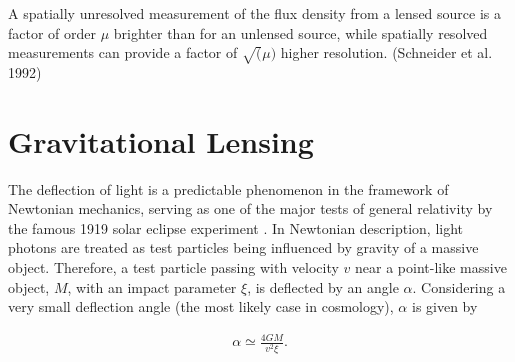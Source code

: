 \documentclass[paper=a4, fontsize=11pt]{scrartcl} %
\numberwithin{equation}{section} %
\numberwithin{figure}{section} %
\numberwithin{table}{section} %
\begin{document}
A spatially unresolved measurement of the flux density from a lensed source is a factor of order $\mu$ brighter than for an unlensed source, while spatially resolved measurements can provide a factor of $\sqrt(\mu)$ higher resolution. (Schneider et al. 1992)


\newpage
\section{Gravitational Lensing} 
The deflection of light is a predictable phenomenon in the framework of Newtonian mechanics, serving as one of the major tests of general relativity by the famous 1919 solar eclipse experiment \citep[][]{Eddington+1919}. In Newtonian description, light photons are treated as test particles being influenced by gravity of a massive object. Therefore, a test particle passing with velocity $v$ near a point-like massive object, $M$, with an impact parameter $\xi$, is deflected by an angle $\alpha$. Considering a very small deflection angle (the most likely case in cosmology), $\alpha$ is given by

\begin{eqnarray}
\label{eq:alpha}
\alpha \simeq \frac{4GM}{v^2 \xi}.
\end{eqnarray}
\end{document}

